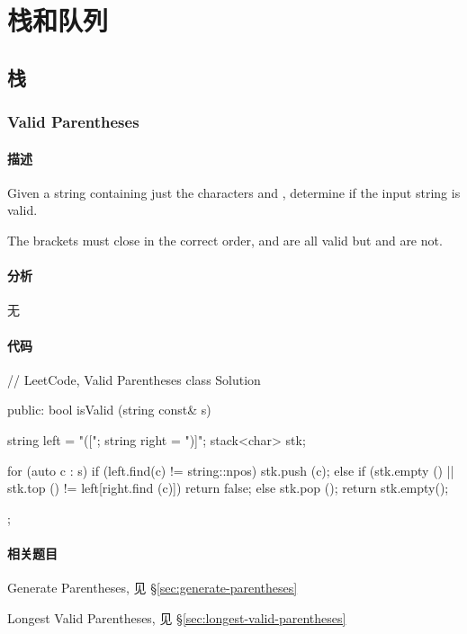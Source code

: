 \chapter{栈和队列}


\section{栈} %


\subsection{Valid Parentheses} %
\label{sec:valid-parentheses}


\subsubsection{描述}
Given a string containing just the characters \code{'(', ')', '\{', '\}', '['} and \code{']'}, determine if the input string is valid.

The brackets must close in the correct order,  and  are all valid but \code{"(]"} and  are not.


\subsubsection{分析}
无


\subsubsection{代码}
\begin{Code}
// LeetCode, Valid Parentheses
class Solution {
public:
    bool isValid (string const& s) {
        string left = "([{";
        string right = ")]}";
        stack<char> stk;

        for (auto c : s) {
            if (left.find(c) != string::npos) {
                stk.push (c);
            } else {
                if (stk.empty () || stk.top () != left[right.find (c)])
                    return false;
                else
                    stk.pop ();
            }
        }
        return stk.empty();
    }
};
\end{Code}


\subsubsection{相关题目}
\begindot
\item Generate Parentheses, 见 \S \ref{sec:generate-parentheses}
\item Longest Valid Parentheses, 见 \S \ref{sec:longest-valid-parentheses}
\myenddot


